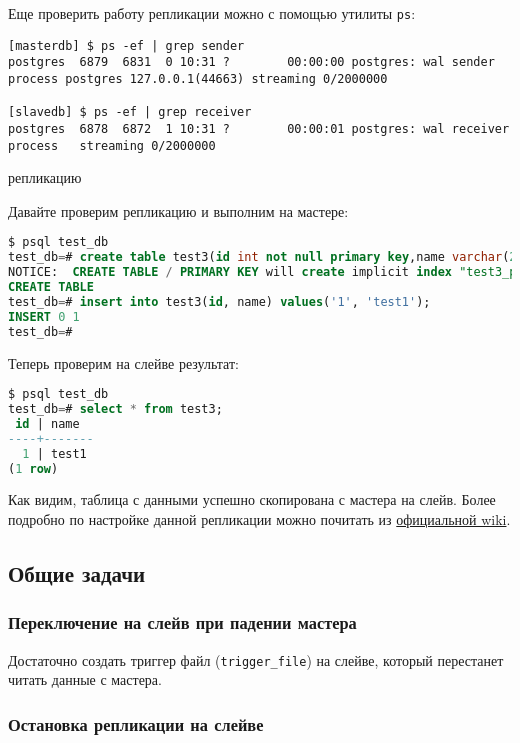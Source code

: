 Еще проверить работу репликации можно с помощью утилиты \lstinline!ps!:

\begin{lstlisting}[label=lst:streaming16,caption=Тестирование репликации]
[masterdb] $ ps -ef | grep sender
postgres  6879  6831  0 10:31 ?        00:00:00 postgres: wal sender process postgres 127.0.0.1(44663) streaming 0/2000000

[slavedb] $ ps -ef | grep receiver
postgres  6878  6872  1 10:31 ?        00:00:01 postgres: wal receiver process   streaming 0/2000000
\end{lstlisting}репликацию

Давайте проверим репликацию и выполним на мастере:

\begin{lstlisting}[language=SQL,label=lst:streaming17,caption=Выполняем на мастере]
$ psql test_db
test_db=# create table test3(id int not null primary key,name varchar(20));
NOTICE:  CREATE TABLE / PRIMARY KEY will create implicit index "test3_pkey" for table "test3"
CREATE TABLE
test_db=# insert into test3(id, name) values('1', 'test1');
INSERT 0 1
test_db=#
\end{lstlisting}

Теперь проверим на слейве результат:

\begin{lstlisting}[language=SQL,label=lst:streaming18,caption=Выполняем на слейве]
$ psql test_db
test_db=# select * from test3;
 id | name
----+-------
  1 | test1
(1 row)
\end{lstlisting}

Как видим, таблица с данными успешно скопирована с мастера на слейв. Более подробно по настройке данной репликации можно почитать из \href{https://wiki.postgresql.org/wiki/Streaming_Replication}{официальной wiki}.

\subsection{Общие задачи}

\subsubsection{Переключение на слейв при падении мастера}

Достаточно создать триггер файл (\lstinline!trigger_file!) на слейве, который перестанет читать данные с мастера.

\subsubsection{Остановка репликации на слейве}

